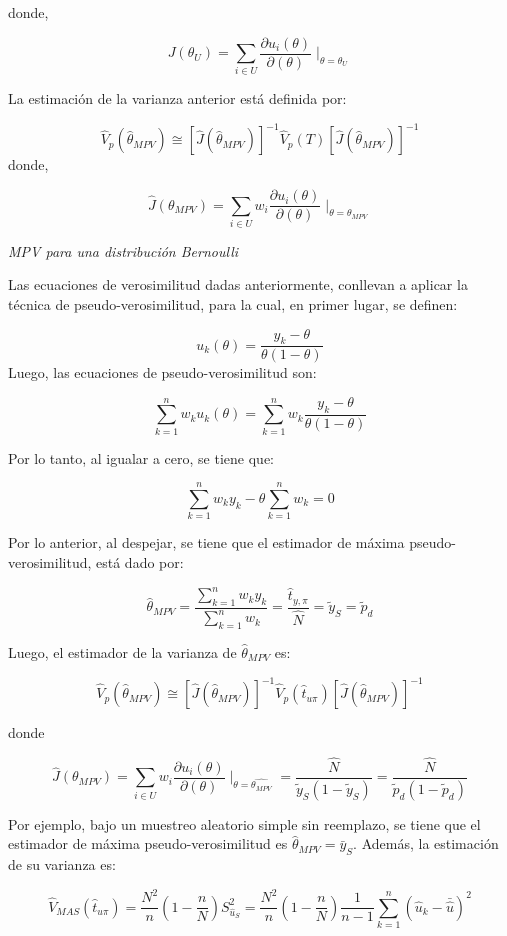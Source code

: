 \documentclass[
  12pt,
]{book}
\begin{document}
donde,

\[
J(\theta_{U})=\sum_{i\in U}\dfrac{\partial u_{i}(\theta)}{\partial(\theta)}\mid_{\theta=\theta_{U}}
\]

La estimación de la varianza anterior está definida por:

\[
\hat{V}_{p}(\hat{\theta}_{MPV})\cong[\hat{J}(\hat{\theta}_{MPV})]^{-1}\hat{V}_{p}(T)[\hat{J}(\hat{\theta}_{MPV})]^{-1}
\]
donde,

\[
\hat{J}(\theta_{MPV})=\sum_{i\in U}w_{i}\dfrac{\partial u_{i}(\theta)}{\partial(\theta)}\mid_{\theta=\theta_{MPV}}
\]

\emph{MPV para una distribución Bernoulli}

Las ecuaciones de verosimilitud dadas anteriormente, conllevan a aplicar la técnica de pseudo-verosimilitud, para la cual, en primer lugar, se definen:

\[
u_{k}(\theta)=\frac{y_{k}-\theta}{\theta(1-\theta)}
\]
Luego, las ecuaciones de pseudo-verosimilitud son:

\[
\sum_{k=1}^{n}w_{k}u_{k}(\theta)=\sum_{k=1}^{n}w_{k}\frac{y_{k}-\theta}{\theta(1-\theta)}
\]

Por lo tanto, al igualar a cero, se tiene que:

\[
\sum_{k=1}^{n}w_{k}y_{k}-\theta\sum_{k=1}^{n}w_{k}=0
\]

Por lo anterior, al despejar, se tiene que el estimador de máxima pseudo-verosimilitud, está dado por:

\[
\hat{\theta}_{MPV}=\frac{\sum_{k=1}^{n}w_{k}y_{k}}{\sum_{k=1}^{n}w_{k}}=\frac{\hat{t}_{y,\pi}}{\hat{N}}=\tilde{y}_{S}=\tilde{p}_{d}
\]

Luego, el estimador de la varianza de \(\hat{\theta}_{MPV}\) es:

\[
\hat{V}_{p}(\hat{\theta}_{MPV})\cong[\hat{J}(\hat{\theta}_{MPV})]^{-1}\hat{V}_{p}(\hat{t}_{u\pi})[\hat{J}(\hat{\theta}_{MPV})]^{-1}
\]

donde

\[
\hat{J}(\theta_{MPV})=\sum_{i\in U}w_{i}\dfrac{\partial u_{i}(\theta)}{\partial(\theta)}\mid_{\theta=\hat{\theta_{MPV}}}=\frac{\hat{N}}{\tilde{y}_{S}(1-\tilde{y}_{S})}=\frac{\hat{N}}{\tilde{p}_{d}(1-\tilde{p}_{d})}
\]

Por ejemplo, bajo un muestreo aleatorio simple sin reemplazo, se tiene que el estimador de máxima pseudo-verosimilitud es \(\hat{\theta}_{MPV}=\bar{y}_{S}\). Además, la estimación de su varianza es:

\[
\hat{V}_{MAS}(\hat{t}_{u\pi})=\frac{N^{2}}{n}\left(1-\frac{n}{N}\right)S_{\hat{u}_{S}}^{2}=\frac{N^{2}}{n}\left(1-\frac{n}{N}\right)\frac{1}{n-1}\sum_{k=1}^{n}(\hat{u}_{k}-\bar{\hat{u}})^{2}
\]
\end{document}
